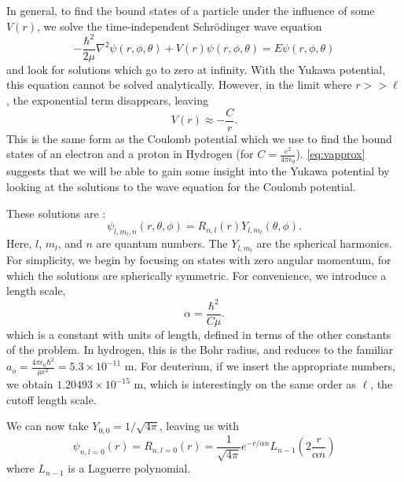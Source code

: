 \documentclass[12pt,twoside]{reedthesis}
\newcommand{\eqn}[1]{\begin{equation}#1\end{equation}}
\begin{document}
In general, to find the bound states of a particle under the influence of some $V(r)$, we solve the time-independent Schr\"odinger wave equation
\eqn{
-\frac{\hbar^2}{2\mu}\nabla^2\psi(r,\phi,\theta) + V(r)\psi (r,\phi,\theta) = E \psi(r,\phi,\theta)
\label{eq:TIDSWE-general}
} and look for solutions which go to zero at infinity.
With the Yukawa potential, this equation cannot be solved analytically. However, in the limit where $r >> \ell$, the exponential term disappears, leaving
\eqn{
V(r) \approx -\frac{C}{r}\mbox{.}
\label{eq:vapprox}
}
This is the same form as the Coulomb potential which we use to find the bound states of an electron and a proton in Hydrogen (for $C = \frac{e^2}{4\pi\epsilon_0}$). \eqref{eq:vapprox} suggests that we will be able to gain some insight into the Yukawa potential by looking at the solutions to the wave equation for the Coulomb potential. 

These solutions are \cite{griffiths_introduction_2005}:
\eqn{
\psi_{l, m_l, n} (r, \theta, \phi) = R_{n,l}(r) Y_{l,m_l}(\theta,\phi)\mbox{.}
}
Here, $l$, $m_l$, and $n$ are quantum numbers. The $Y_{l, m_l}$ are the spherical harmonics. For simplicity, we begin by focusing on states with zero angular momentum, for which the solutions are spherically symmetric.
For convenience, we introduce a length scale, 
\eqn{
\alpha = \frac{\hbar^2}{C \mu}\mbox{.}
\label{eq:bohrradius}
}
which is a constant with units of length, defined in terms of the other constants of the problem. 
In hydrogen, this is the Bohr radius, and reduces to the familiar $a_o = \frac{4\pi \epsilon_0 \hbar^2}{\mu e^2} = 5.3 \times 10^{-11}$ m. For deuterium, if we insert the appropriate numbers, we obtain $1.20493 \times 10^{-15}$ m, which is interestingly on the same order as $\ell$, the cutoff length scale.

We can now take $Y_{0,0} = 1/\sqrt{4 \pi}$, leaving us with
\eqn{
\psi_{n, l =0}(r) = R_{n , l= 0}(r) = \frac{1}{\sqrt{4\pi}} e^{-r /\alpha n}L_{n-1} \left(2\frac{r}{ \alpha n}\right)
\label{eq:SWE-coulomb}
}
where $L_{n-1}$ is a Laguerre polynomial. 
\end{document}
